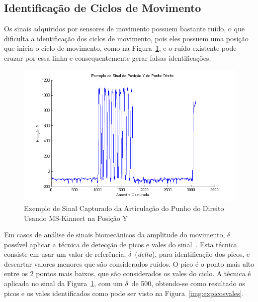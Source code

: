 \subsection{Identificação de Ciclos de Movimento}\label{section:identificao_ciclos}

Os sinais adquiridos por sensores de movimento possuem bastante ruído, o que dificulta a identificação dos ciclos de movimento, pois eles possuem uma posição que inicia o ciclo de movimento, como na Figura~\ref{img:exsinalposicaopunho}, e o ruído existente pode cruzar por essa linha e consequentemente gerar falsas identificações. 

\begin{figure}[!htb]
     \centering
     \includegraphics[width=1\textwidth]{./img/exsinalposicaoypunhodireito.png}
     \caption{Exemplo de Sinal Capturado da Articulação do Punho do Direito Usando MS-Kinnect na Posição Y}
     \label{img:exsinalposicaopunho}
\end{figure}

Em casos de análise de sinais biomecânicos da amplitude do movimento, é possível aplicar a técnica de detecção de picos e vales do sinal~\cite{peakdetect}. Esta técnica consiste em usar um valor de referência, $\delta$\ (\textit{delta}), para identificação dos picos, e descartar valores menores que são considerados ruídos. O pico é o ponto mais alto entre os 2 pontos mais baixos, que são considerados os vales do ciclo. A técnica é aplicada no sinal da Figura~\ref{img:exsinalposicaopunho}, com um $\delta$\ de 500, obtendo-se como resultado os picos e os vales identificados como pode ser visto na Figura~\ref{img:expicosvales}.

